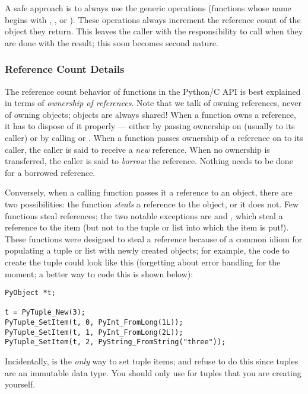 \documentclass{manual}
\begin{document}
A safe approach is to always use the generic operations (functions 
whose name begins with , ,
 or ).  These operations always
increment the reference count of the object they return.  This leaves
the caller with the responsibility to call
 when they are done with the result; this soon
becomes second nature.


\subsubsection{Reference Count Details \label{refcountDetails}}

The reference count behavior of functions in the Python/C API is best 
explained in terms of \emph{ownership of references}.  Note that we 
talk of owning references, never of owning objects; objects are always 
shared!  When a function owns a reference, it has to dispose of it 
properly --- either by passing ownership on (usually to its caller) or 
by calling  or .  When
a function passes ownership of a reference on to its caller, the
caller is said to receive a \emph{new} reference.  When no ownership
is transferred, the caller is said to \emph{borrow} the reference.
Nothing needs to be done for a borrowed reference.

Conversely, when a calling function passes it a reference to an 
object, there are two possibilities: the function \emph{steals} a 
reference to the object, or it does not.  Few functions steal 
references; the two notable exceptions are
 and
, which 
steal a reference to the item (but not to the tuple or list into which
the item is put!).  These functions were designed to steal a reference
because of a common idiom for populating a tuple or list with newly
created objects; for example, the code to create the tuple  could look like this (forgetting about error handling for
the moment; a better way to code this is shown below):

\begin{verbatim}
PyObject *t;

t = PyTuple_New(3);
PyTuple_SetItem(t, 0, PyInt_FromLong(1L));
PyTuple_SetItem(t, 1, PyInt_FromLong(2L));
PyTuple_SetItem(t, 2, PyString_FromString("three"));
\end{verbatim}

Incidentally,  is the \emph{only} way to
set tuple items;  and
 refuse to do this since tuples are an
immutable data type.  You should only use
 for tuples that you are creating
yourself.
\end{document}
